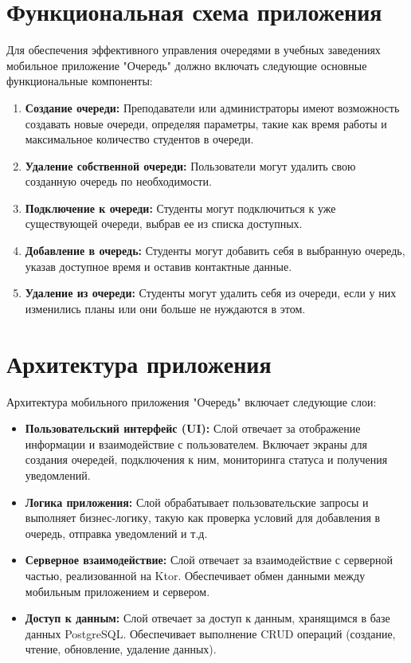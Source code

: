 
\section{Функциональная схема приложения}

Для обеспечения эффективного управления очередями в учебных заведениях мобильное приложение "Очередь" должно включать следующие основные функциональные компоненты:

\begin{enumerate}
	\item \textbf{Создание очереди:} Преподаватели или администраторы
		имеют возможность создавать новые очереди, определяя параметры,
		такие как время работы и максимальное количество студентов в очереди.
	\item \textbf{Удаление собственной очереди:} Пользователи могут удалить
		свою созданную очередь по необходимости.
	\item \textbf{Подключение к очереди:} Студенты могут подключиться
		к уже существующей очереди, выбрав ее из списка доступных.
	\item \textbf{Добавление в очередь:} Студенты могут добавить себя
		в выбранную очередь, указав доступное время
		и оставив контактные данные.
	\item \textbf{Удаление из очереди:} Студенты могут удалить себя из очереди,
		если у них изменились планы или они больше не нуждаются в этом.
\end{enumerate}

\section{Архитектура приложения}

Архитектура мобильного приложения "Очередь" включает следующие слои:

\begin{itemize}
    \item \textbf{Пользовательский интерфейс (UI):} Слой отвечает
		за отображение информации и взаимодействие с пользователем.
		Включает экраны для создания очередей, подключения к ним,
		мониторинга статуса и получения уведомлений.
    \item \textbf{Логика приложения:} Слой обрабатывает пользовательские
		запросы и выполняет бизнес-логику, такую как проверка условий
		для добавления в очередь, отправка уведомлений и т.д.
    \item \textbf{Серверное взаимодействие:} Слой отвечает за взаимодействие
		с серверной частью, реализованной на Ktor.
		Обеспечивает обмен данными между мобильным приложением и сервером.
    \item \textbf{Доступ к данным:} Слой отвечает за доступ к данным,
		хранящимся в базе данных PostgreSQL.
		Обеспечивает выполнение CRUD операций
		(создание, чтение, обновление, удаление данных).
\end{itemize}

